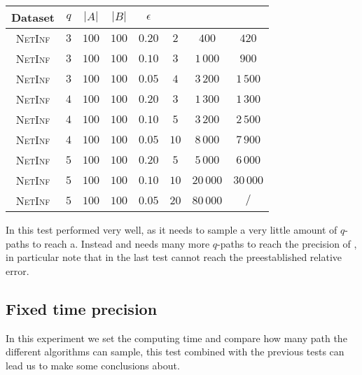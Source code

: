 	\begin{table}[h]
		\centering
		\label{my-label}
		\begin{tabular}{|c|c|c|c|c|c|c|c|}
			\hline
			Dataset 		& $q$ & $|A|$ & $|B|$ & $\epsilon$ & \fcount & \fsamp    & \base    \\ \hline
			\textsc{NetInf}	& $3$ & $100$ & $100$ & $0.20$     & $2$	 & $400$     & $420$    \\ \hline
			\textsc{NetInf}	& $3$ & $100$ & $100$ & $0.10$     & $3$	 & $1\,000$  & $900$    \\ \hline
			\textsc{NetInf}	& $3$ & $100$ & $100$ & $0.05$     & $4$	 & $3\,200$  & $1\,500$ \\ \hline
			\textsc{NetInf}	& $4$ & $100$ & $100$ & $0.20$     & $3$	 & $1\,300$  & $1\,300$ \\ \hline
			\textsc{NetInf}	& $4$ & $100$ & $100$ & $0.10$     & $5$	 & $3\,200$  & $2\,500$ \\ \hline
			\textsc{NetInf}	& $4$ & $100$ & $100$ & $0.05$     & $10$	 & $8\,000$  & $7\,900$ \\ \hline
			\textsc{NetInf}	& $5$ & $100$ & $100$ & $0.20$     & $5$	 & $5\,000$  & $6\,000$ \\ \hline
			\textsc{NetInf}	& $5$ & $100$ & $100$ & $0.10$     & $10$	 & $20\,000$ & $30\,000$ \\ \hline
			\textsc{NetInf}	& $5$ & $100$ & $100$ & $0.05$     & $20$	 & $80\,000$ & $/$ \\ \hline
		\end{tabular}
	\end{table}
	
	In this test \fcount performed very well, as it needs to sample a very little amount of $q$-paths to reach a.
	Instead \fsamp and \base needs many more $q$-paths to reach the precision of \fcount, in particular note that in the last test \base cannot reach the preestablished relative error.
	
	\subsection*{Fixed time precision}

	In this experiment we set the computing time and compare how many path the different algorithms can sample,
	this test combined with the previous tests can lead us to make some conclusions about.\\
	
